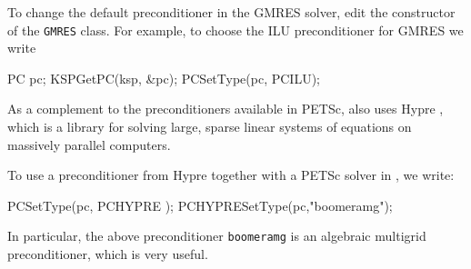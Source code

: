 To change the default preconditioner in the \dolfin{} GMRES solver, edit the 
constructor of the \texttt{GMRES} class. For example, to choose the 
ILU preconditioner for GMRES we write 
%
\begin{code}
PC pc;
KSPGetPC(ksp, &pc);
PCSetType(pc, PCILU);
\end{code}

As a complement to the preconditioners available in PETSc, 
\dolfin{} also uses Hypre \cite{www:hypre}, which is a 
library for solving large, sparse linear systems of equations on 
massively parallel computers. 

To use a preconditioner from Hypre together with a PETSc solver in \dolfin{}, we write:  
%
\begin{code}
PCSetType(pc, PCHYPRE );
PCHYPRESetType(pc,"boomeramg");
\end{code}

In particular, the above preconditioner \texttt{boomeramg} is an algebraic multigrid 
preconditioner, which is very useful. 

